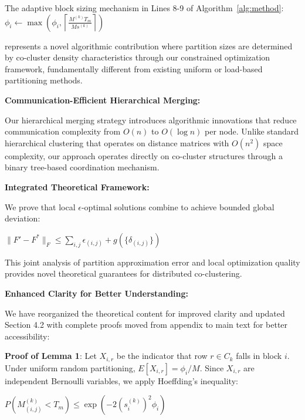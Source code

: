 \documentclass{ar2rc}
\begin{document}
The adaptive block sizing mechanism in Lines 8-9 of Algorithm~\ref{alg:method}:
$\phi_i \leftarrow \max\left(\phi_i, \left\lceil\frac{M^{(k)}T_m}{Ms^{(k)}}\right\rceil\right)$

represents a novel algorithmic contribution where partition sizes are determined by co-cluster density characteristics through our constrained optimization framework, fundamentally different from existing uniform or load-based partitioning methods.

\textbf{Communication-Efficient Hierarchical Merging:}

Our hierarchical merging strategy introduces algorithmic innovations that reduce communication complexity from $O(n)$ to $O(\log n)$ per node. Unlike standard hierarchical clustering that operates on distance matrices with $O(n^2)$ space complexity, our approach operates directly on co-cluster structures through a binary tree-based coordination mechanism.

\textbf{Integrated Theoretical Framework:}

We prove that local $\epsilon$-optimal solutions combine to achieve bounded global deviation:

$\|F' - F^*\|_F \leq \sum_{i,j} \epsilon_{(i,j)} + g(\{\delta_{(i,j)}\})$

This joint analysis of partition approximation error and local optimization quality provides novel theoretical guarantees for distributed co-clustering.



\textbf{Enhanced Clarity for Better Understanding:}

We have reorganized the theoretical content for improved clarity and updated Section 4.2 with complete proofs moved from appendix to main text for better accessibility:

\textbf{Proof of Lemma 1}: Let $X_{i,r}$ be the indicator that row $r \in C_k$ falls in block $i$. Under uniform random partitioning, $E[X_{i,r}] = \phi_i/M$. Since $X_{i,r}$ are independent Bernoulli variables, we apply Hoeffding's inequality:

$P(M_{(i,j)}^{(k)} < T_m) \leq \exp\left(-2(s_i^{(k)})^2 \phi_i\right)$
\end{document}
